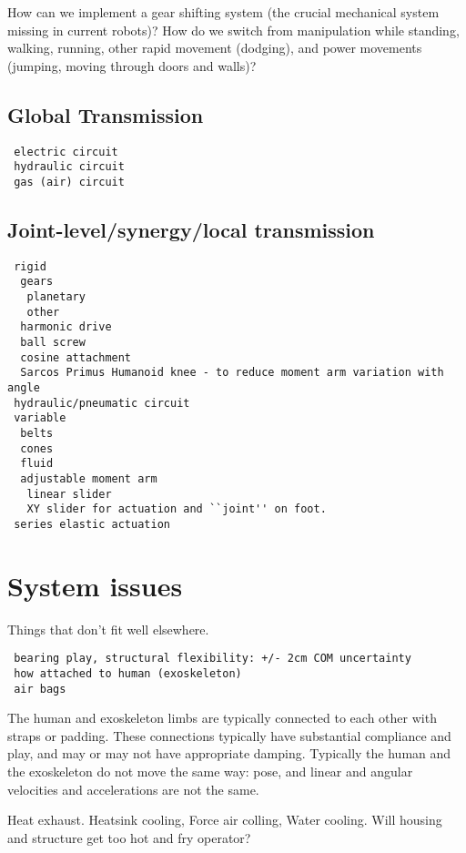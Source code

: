 \documentclass[letterpaper,12pt,fullpage]{article}
\begin{document}
How can we implement a gear shifting system (the crucial mechanical
system missing in current robots)? How do we switch from manipulation
while standing, walking, running, other rapid movement (dodging), and
power movements (jumping, moving through doors and walls)?

\subsection{Global Transmission}

\begin{verbatim}
 electric circuit
 hydraulic circuit
 gas (air) circuit
\end{verbatim}

\subsection{Joint-level/synergy/local transmission}

\begin{verbatim}
 rigid
  gears
   planetary
   other
  harmonic drive
  ball screw
  cosine attachment
  Sarcos Primus Humanoid knee - to reduce moment arm variation with angle
 hydraulic/pneumatic circuit
 variable
  belts
  cones
  fluid
  adjustable moment arm
   linear slider
   XY slider for actuation and ``joint'' on foot.
 series elastic actuation
\end{verbatim}

\section{System issues}

Things that don't fit well elsewhere.

\begin{verbatim}
 bearing play, structural flexibility: +/- 2cm COM uncertainty
 how attached to human (exoskeleton)
 air bags
\end{verbatim}

The human and exoskeleton limbs are typically connected to each
other with straps or padding. These connections typically have substantial
compliance and play, and may or may not have appropriate damping.
Typically the human and the exoskeleton do not move the same way:
pose, and linear and angular velocities and accelerations are not the same.

Heat exhaust. Heatsink cooling, Force air colling, Water cooling.
Will housing and structure get too hot and fry operator?
\end{document}
